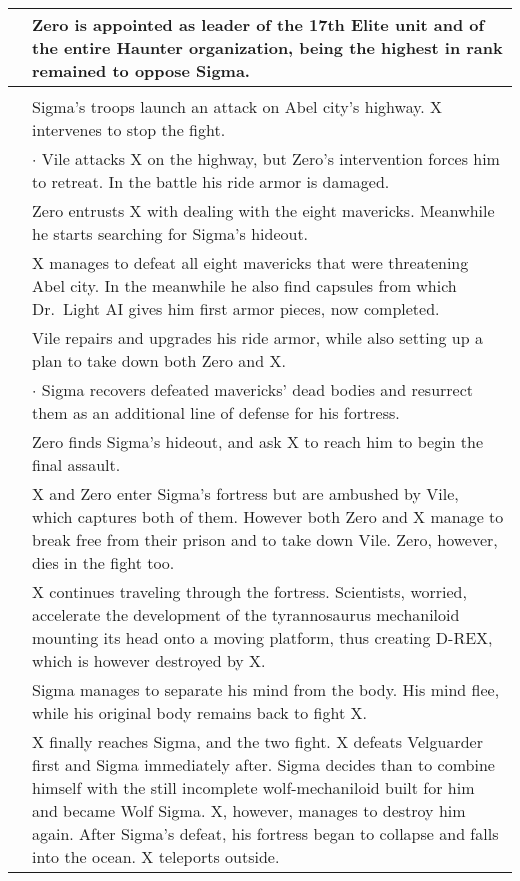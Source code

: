 \begin{tabularx}{\linewidth}{l X}
	\tabdot& Zero is appointed as leader of the 17th Elite unit and of the entire Haunter organization, being the highest in rank remained to oppose Sigma.\\
	\midrule
	\rowcolor{Aquamarine}
	\multicolumn{2}{c}{\textbf{Mega Man X}}\\
	\addlinespace[1.5ex]
	\tabdot& Sigma's troops launch an attack on Abel city's highway. X intervenes to stop the fight.\\
	\tabline& $\cdot$ Vile attacks X on the highway, but Zero's intervention forces him to retreat. In the battle his ride armor is damaged.\\
	\tabdot& Zero entrusts X with dealing with the eight mavericks. Meanwhile he starts searching for Sigma's hideout.\\
	\tabdot& X manages to defeat all eight mavericks that were threatening Abel city. In the meanwhile he also find capsules from which Dr.~Light AI gives him first armor pieces, now completed.\\
	\tabdot& Vile repairs and upgrades his ride armor, while also setting up a plan to take down both Zero and X.\\
	\tabline& $\cdot$ Sigma recovers defeated mavericks' dead bodies and resurrect them as an additional line of defense for his fortress.\\
	\tabdot& Zero finds Sigma's hideout, and ask X to reach him to begin the final assault.\\
	\tabdot& X and Zero enter Sigma's fortress but are ambushed by Vile, which captures both of them. However both Zero and X manage to break free from their prison and to take down Vile. Zero, however, dies in the fight too.\\
	\tabdot& X continues traveling through the fortress. Scientists, worried, accelerate the development of the tyrannosaurus mechaniloid mounting its head onto a moving platform, thus creating D-REX, which is however destroyed by X.\\
	\tabdot& Sigma manages to separate his mind from the body. His mind flee, while his original body remains back to fight X.\\
	\tabdot& X finally reaches Sigma, and the two fight. X defeats Velguarder first and Sigma immediately after. Sigma decides than to combine himself with the still incomplete wolf-mechaniloid built for him and became Wolf Sigma. X, however, manages to destroy him again. After Sigma's defeat, his fortress began to collapse and falls into the ocean. X teleports outside.\\
 	\midrule
\end{tabularx}